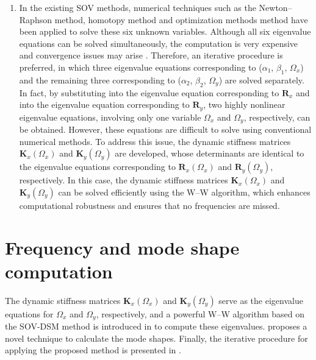 \documentclass[preprint,12pt,number]{elsarticle}
\begin{document}
\begin{enumerate}[label=(\roman*)]
	\item In the existing SOV methods, numerical techniques such as the Newton–Raphson
	method, homotopy method and optimization methods method have been applied to solve these six unknown variables.  
	Although all six eigenvalue equations can be solved simultaneously, the computation is very expensive and convergence issues may arise \citep{wang2021extended,wang2021closed}.  
	Therefore, an iterative procedure \cite{xing2018overall,wang2021extended,wang2021closed,wang2019highly,wang2020highly} is preferred, in which three eigenvalue equations corresponding to ($\alpha_1$, $\beta_1$, $\Omega_x$) and the remaining three corresponding to ($\alpha_2$, $\beta_2$, $\Omega_y$) are solved separately.
	In fact, by substituting  into the eigenvalue equation corresponding to $\mathbf{R}_x$ and  into the eigenvalue equation corresponding to $\mathbf{R}_y$, two highly nonlinear eigenvalue equations, involving only one variable $\Omega_x$ and $\Omega_y$, respectively, can be obtained. 
	However, these equations are difficult to solve using conventional numerical methods.
	To address this issue, the dynamic stiffness matrices $\mathbf{K}_x(\Omega_x)$ and $\mathbf{K}_y(\Omega_y)$ are developed, whose determinants are identical to the eigenvalue equations corresponding to $\mathbf{R}_x(\Omega_x)$ and $\mathbf{R}_y(\Omega_y)$, respectively.
	In this case, the dynamic stiffness matrices $\mathbf{K}_x(\Omega_x)$ and $\mathbf{K}_y(\Omega_y)$ can be solved efficiently using the W–W algorithm, which enhances computational robustness and ensures that no frequencies are missed.
\end{enumerate}

 

\section{Frequency and mode shape computation}\label{sec:WWA}
The dynamic stiffness matrices $\mathbf{K}_x(\Omega_x)$ and $\mathbf{K}_y(\Omega_y)$ serve as the eigenvalue equations for $\Omega_x$ and $\Omega_y$, respectively, and a powerful W–W algorithm based on the SOV-DSM method is introduced in  to compute these eigenvalues.
 proposes a novel technique to calculate the mode shapes.  
Finally, the iterative procedure for applying the proposed method is presented in .
\end{document}
